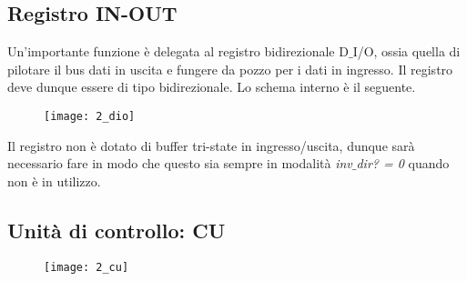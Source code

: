 \subsection{Registro IN-OUT}
Un'importante funzione è delegata al registro bidirezionale D$\_$I/O, ossia quella di pilotare il bus dati in uscita e fungere da pozzo per i dati in ingresso. Il registro deve dunque essere di tipo bidirezionale. Lo schema interno è il seguente.
\begin{figure}[H]
	\centering
	\texttt{[image: 2\_dio]}
	\label{fig:dio}
\end{figure}
\noindent
Il registro non è dotato di buffer tri-state in ingresso/uscita, dunque sarà necessario fare in modo che questo sia sempre in modalità \textit{inv$\_$dir? = 0} quando non è in utilizzo.

\subsection{Unità di controllo: CU}
\begin{figure}[H]
	\centering
	\texttt{[image: 2\_cu]}
	\label{fig:cu}
\end{figure}
\newpage
